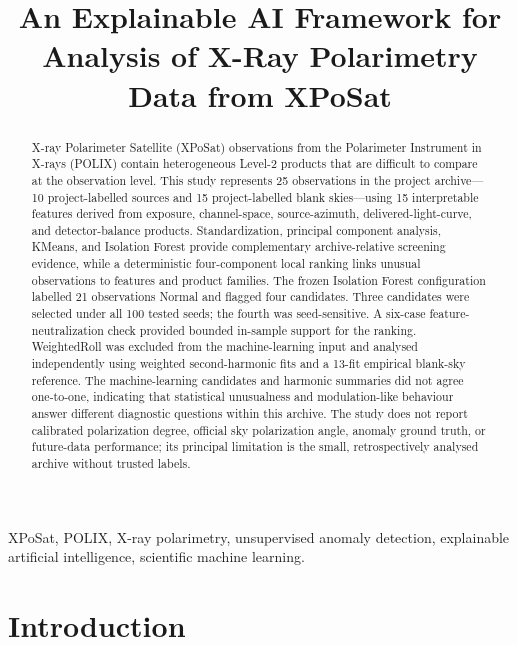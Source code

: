 \documentclass[conference]{IEEEtran}
\title{An Explainable AI Framework for Analysis of X-Ray Polarimetry Data from XPoSat}
\author{\IEEEauthorblockN{[Student Author 1], [Student Author 2], [Student Author 3], and [Student Author 4]}%
\IEEEauthorblockA{[Department], [Institution], [City, Country]\\
[author emails to be inserted after guide approval]}}
\begin{document}
\maketitle

\begin{abstract}

X-ray Polarimeter Satellite (XPoSat) observations from the Polarimeter Instrument in X-rays (POLIX) contain heterogeneous Level-2 products that are difficult to compare at the observation level. This study represents 25 observations in the project archive---10 project-labelled sources and 15 project-labelled blank skies---using 15 interpretable features derived from exposure, channel-space, source-azimuth, delivered-light-curve, and detector-balance products. Standardization, principal component analysis, KMeans, and Isolation Forest provide complementary archive-relative screening evidence, while a deterministic four-component local ranking links unusual observations to features and product families. The frozen Isolation Forest configuration labelled 21 observations Normal and flagged four candidates. Three candidates were selected under all 100 tested seeds; the fourth was seed-sensitive. A six-case feature-neutralization check provided bounded in-sample support for the ranking. WeightedRoll was excluded from the machine-learning input and analysed independently using weighted second-harmonic fits and a 13-fit empirical blank-sky reference. The machine-learning candidates and harmonic summaries did not agree one-to-one, indicating that statistical unusualness and modulation-like behaviour answer different diagnostic questions within this archive. The study does not report calibrated polarization degree, official sky polarization angle, anomaly ground truth, or future-data performance; its principal limitation is the small, retrospectively analysed archive without trusted labels.

\end{abstract}

\begin{IEEEkeywords}XPoSat, POLIX, X-ray polarimetry, unsupervised anomaly detection, explainable artificial intelligence, scientific machine learning.\end{IEEEkeywords}

\section{Introduction}
\end{document}
